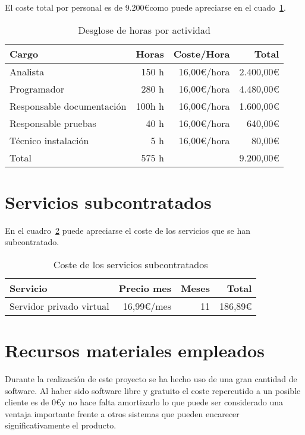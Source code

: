 El coste total por personal es de 9.200\euro como puede apreciarse en el cuado~\ref{tab:des_prec_horas}.

\begin{table}
	\centering
	
	\begin{tabular}{|l|r|r|r|}
		\hline
		Cargo & Horas & Coste/Hora & Total \\
		\hline
		Analista & 150 h & 16,00\euro/hora & 2.400,00\euro\\
		\hline
		Programador & 280 h & 16,00\euro/hora & 4.480,00\euro\\
		\hline
		Responsable documentación & 100h h & 16,00\euro/hora & 1.600,00\euro\\
		\hline
		Responsable pruebas & 40 h & 16,00\euro/hora & 640,00\euro\\
		\hline
		Técnico instalación & 5 h & 16,00\euro/hora & 80,00\euro\\
		\hline
		\hline
		Total & 575 h & \multicolumn{2}{|r|}{9.200,00\euro} \\
		\hline
	\end{tabular}
	\caption{Desglose de horas por actividad}\label{tab:des_prec_horas}
\end{table}


\section{Servicios subcontratados}

En el cuadro~\ref{tab:serv_subcont} puede apreciarse el coste de los servicios que se han subcontratado.

\begin{table}
	\centering
	
	\begin{tabular}{|l|r|r|r|}
		\hline
		Servicio & Precio mes & Meses & Total\\
		\hline
		Servidor privado virtual & 16,99\euro/mes & 11 & 186,89\euro\\
		\hline
	\end{tabular}
	\caption{Coste de los servicios subcontratados}\label{tab:serv_subcont}
\end{table}

\section{Recursos materiales empleados}

Durante la realización de este proyecto se ha hecho uso de una gran cantidad de software. Al haber sido software libre y gratuito el coste repercutido a un posible cliente es de 0\euro y no hace falta amortizarlo lo que puede ser considerado una ventaja importante frente a otros sistemas que pueden encarecer significativamente el producto.

